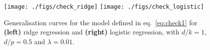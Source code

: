 \documentclass[11pt]{article}
\numberwithin{equation}{section}
\begin{document}
 \begin{figure}[h]
		\centering
		\texttt{[image: ./figs/check\_ridge]}
		\texttt{[image: ./figs/check\_logistic]}
	\caption{Generalisation curves for the model defined in eq.~\eqref{eq:check1} for \textbf{(\textbf{left})} ridge regression and \textbf{(\textbf{right})} logistic regression, with $d/k = 1$, $d/p = 0.5$ and $\lambda = 0.01$.
	}
	\label{fig:check1}
\end{figure}
\end{document}

